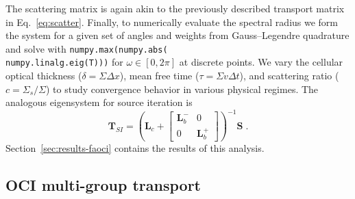 The scattering matrix is again akin to the previously described transport matrix in Eq.~\eqref{eq:scatter}.
Finally, to numerically evaluate the spectral radius we form the system for a given set of angles and weights from Gauss--Legendre quadrature and solve with \texttt{numpy.max(numpy.abs(\\numpy.linalg.eig(T)))} for $\omega \in [0,2\pi]$ at discrete points.
We vary the cellular optical thickness ($\delta =\Sigma \Delta x$), mean free time ($\tau = \Sigma v\Delta t$), and scattering ratio ($c=\Sigma_s/\Sigma$) to study convergence behavior in various physical regimes. 
The analogous eigensystem for source iteration is
\begin{equation}
    \bm{T}_{SI} = \left( 
    \bm{L}_c
    + \begin{bmatrix}
        \bm{L}_b^- & 0\\
        0 & \bm{L}_b^+
    \end{bmatrix}
    \right)^{-1}
    \bm{S} \; .
\end{equation} 
Section~\ref{sec:results-faoci} contains the results of this analysis.


\subsection{OCI multi-group transport}

